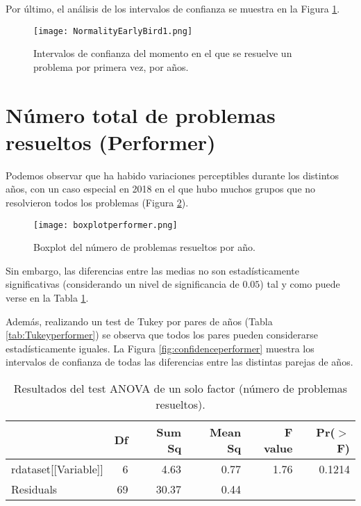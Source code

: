 Por último, el análisis de los intervalos de confianza se muestra en la Figura \ref{fig:confidenceearlybird}.

\begin{figure}[H]
    \centering
    \texttt{[image: NormalityEarlyBird1.png]}
    \caption{Intervalos de confianza del momento en el que se resuelve un problema por primera vez, por años.}
    \label{fig:confidenceearlybird}
\end{figure}

\section{Número total de problemas resueltos (Performer)}

Podemos observar que ha habido variaciones perceptibles durante los distintos años, con un caso especial en 2018 en el que hubo muchos grupos que no resolvieron todos los problemas (Figura \ref{fig:boxplotperformer}).

\begin{figure}[H]
    \centering
    \texttt{[image: boxplotperformer.png]}
    \caption{Boxplot del número de problemas resueltos por año.}
    \label{fig:boxplotperformer}
\end{figure}

Sin embargo, las diferencias entre las medias no son estadísticamente significativas (considerando un nivel de significancia de $0.05$) tal y como puede verse en la Tabla \ref{tab:ANOVAperformer}.

Además, realizando un test de Tukey por pares de años (Tabla \ref{tab:Tukeyperformer}) se observa que todos los pares pueden considerarse estadísticamente iguales. La Figura \ref{fig:confidenceperformer} muestra los intervalos de confianza de todas las diferencias entre las distintas parejas de años.

\begin{table}[H]
\centering
\caption{Resultados del test ANOVA de un solo factor (número de problemas resueltos).}
\label{tab:ANOVAperformer}
\begin{tabular}{lrrrrr}
  \hline
 & Df & Sum Sq & Mean Sq & F value & Pr($>$F) \\ 
  \hline
rdataset[[Variable]] & 6 & 4.63 & 0.77 & 1.76 & 0.1214 \\ 
  Residuals            & 69 & 30.37 & 0.44 &  &  \\ 
   \hline
\end{tabular}
\end{table}

